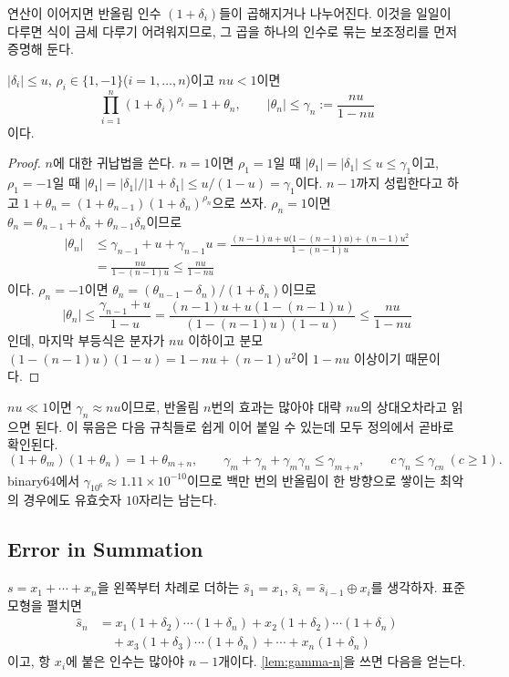 연산이 이어지면 반올림 인수 $(1+\delta_i)$들이 곱해지거나 나누어진다. 이것을 일일이 다루면 식이 금세 다루기 어려워지므로, 그 곱을 하나의 인수로 묶는 보조정리를 먼저 증명해 둔다\cite{higham2002accuracy}.

\begin{lemma}
\label{lem:gamma-n}
$|\delta_i|\le u$, $\rho_i\in\{1,-1\}$($i=1,\dots,n$)이고 $nu<1$이면
\[
\prod_{i=1}^n(1+\delta_i)^{\rho_i}=1+\theta_n,\qquad|\theta_n|\le\gamma_n:=\frac{nu}{1-nu}
\]
이다.
\end{lemma}

\begin{proof}
$n$에 대한 귀납법을 쓴다. $n=1$이면 $\rho_1=1$일 때 $|\theta_1|=|\delta_1|\le u\le\gamma_1$이고, $\rho_1=-1$일 때 $|\theta_1|=|\delta_1|/|1+\delta_1|\le u/(1-u)=\gamma_1$이다. $n-1$까지 성립한다고 하고 $1+\theta_n=(1+\theta_{n-1})(1+\delta_n)^{\rho_n}$으로 쓰자. $\rho_n=1$이면 $\theta_n=\theta_{n-1}+\delta_n+\theta_{n-1}\delta_n$이므로
\begin{align*}
|\theta_n|&\le\gamma_{n-1}+u+\gamma_{n-1}u=\frac{(n-1)u+u\bigl(1-(n-1)u\bigr)+(n-1)u^2}{1-(n-1)u}\\
&=\frac{nu}{1-(n-1)u}\le\frac{nu}{1-nu}
\end{align*}
이다. $\rho_n=-1$이면 $\theta_n=(\theta_{n-1}-\delta_n)/(1+\delta_n)$이므로
\[
|\theta_n|\le\frac{\gamma_{n-1}+u}{1-u}=\frac{(n-1)u+u(1-(n-1)u)}{(1-(n-1)u)(1-u)}\le\frac{nu}{1-nu}
\]
인데, 마지막 부등식은 분자가 $nu$ 이하이고 분모 $(1-(n-1)u)(1-u)=1-nu+(n-1)u^2$이 $1-nu$ 이상이기 때문이다.
\end{proof}

$nu\ll1$이면 $\gamma_n\approx nu$이므로, 반올림 $n$번의 효과는 많아야 대략 $nu$의 상대오차라고 읽으면 된다. 이 묶음은 다음 규칙들로 쉽게 이어 붙일 수 있는데 모두 정의에서 곧바로 확인된다.
\[
(1+\theta_m)(1+\theta_n)=1+\theta_{m+n},\qquad\gamma_m+\gamma_n+\gamma_m\gamma_n\le\gamma_{m+n},\qquad c\,\gamma_n\le\gamma_{cn}\ (c\ge1).
\]
binary64에서 $\gamma_{10^6}\approx1.11\times10^{-10}$이므로 백만 번의 반올림이 한 방향으로 쌓이는 최악의 경우에도 유효숫자 $10$자리는 남는다.

\subsection{Error in Summation}

$s=x_1+\cdots+x_n$을 왼쪽부터 차례로 더하는  $\hat s_1=x_1$, $\hat s_i=\hat s_{i-1}\oplus x_i$를 생각하자. 표준 모형을 펼치면
\begin{align*}
\hat s_n&=x_1(1+\delta_2)\cdots(1+\delta_n)+x_2(1+\delta_2)\cdots(1+\delta_n)\\
&\quad+x_3(1+\delta_3)\cdots(1+\delta_n)+\cdots+x_n(1+\delta_n)
\end{align*}
이고, 항 $x_i$에 붙은 인수는 많아야 $n-1$개이다. \cref{lem:gamma-n}을 쓰면 다음을 얻는다.

